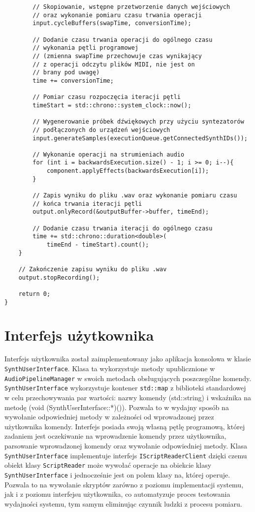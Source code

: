 \begin{lstlisting}
        // Skopiowanie, wstępne przetworzenie danych wejściowych
        // oraz wykonanie pomiaru czasu trwania operacji
        input.cycleBuffers(swapTime, conversionTime);

        // Dodanie czasu trwania operacji do ogólnego czasu
        // wykonania pętli programowej
        // (zmienna swapTime przechowuje czas wynikający
        // z operacji odczytu plików MIDI, nie jest on
        // brany pod uwagę)
        time += conversionTime;

        // Pomiar czasu rozpoczęcia iteracji pętli
        timeStart = std::chrono::system_clock::now();

        // Wygenerowanie próbek dźwiękowych przy użyciu syntezatorów
        // podłączonych do urządzeń wejściowych
        input.generateSamples(executionQueue.getConnectedSynthIDs());

        // Wykonanie operacji na strumieniach audio
        for (int i = backwardsExecution.size() - 1; i >= 0; i--){
            component.applyEffects(backwardsExecution[i]);
        }

        // Zapis wyniku do pliku .wav oraz wykonanie pomiaru czasu
        // końca trwania iteracji pętli
        output.onlyRecord(&outputBuffer->buffer, timeEnd);

        // Dodanie czasu trwania iteracji do ogólnego czasu
        time += std::chrono::duration<double>(
            timeEnd - timeStart).count();
    }

    // Zakończenie zapisu wyniku do pliku .wav
    output.stopRecording();

    return 0;
}
\end{lstlisting}


\section{Interfejs użytkownika}
Interfejs użytkownika został zaimplementowany jako aplikacja konsolowa w klasie \texttt{SynthUserInterface}. Klasa ta wykorzystuje metody upublicznione w \texttt{AudioPipelineManager} w swoich metodach obsługujących poszczególne komendy. \texttt{SynthUserInterface} wykorzystuje kontener \texttt{std::map} z biblioteki standardowej w celu przechowywania par wartości: nazwy komendy (std::string) i wskaźnika na metodę (void (SynthUserInterface::*)()). Pozwala to w wydajny sposób na wywołanie odpowiedniej metody w zależności od wprowadzonej przez użytkownika komendy. Interfejs posiada swoją własną pętlę programową, której zadaniem jest oczekiwanie na wprowadzenie komendy przez użytkownika, parsowanie wprowadzonej komendy oraz wywołanie odpowiedniej metody. Klasa \texttt{SynthUserInterface} implementuje interfejs \texttt{IScriptReaderClient} dzięki czemu obiekt klasy \texttt{ScriptReader} może wywołać operacje na obiekcie klasy \texttt{SynthUserInterface} i jednocześnie jest on polem klasy na, której operuje. Pozwala to na wywołanie skryptów zarówno z poziomu implementacji systemu, jak i z poziomu interfejsu użytkownika, co automatyzuje proces testowania wydajności systemu, tym samym eliminując czynnik ludzki z procesu pomiaru.

